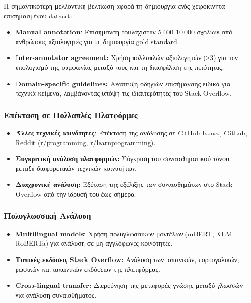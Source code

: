\documentclass[a4paper,11pt,oneside,openany]{ioniothesis}
\begin{document}
Η σημαντικότερη μελλοντική βελτίωση αφορά τη δημιουργία ενός χειροκίνητα επισημασμένου dataset:

\begin{itemize}
    \item \textbf{Manual annotation:} Επισήμανση τουλάχιστον 5.000-10.000 σχολίων από ανθρώπους αξιολογητές για τη δημιουργία gold standard.
    
    \item \textbf{Inter-annotator agreement:} Χρήση πολλαπλών αξιολογητών (≥3) για τον υπολογισμό της συμφωνίας μεταξύ τους και τη διασφάλιση της ποιότητας.
    
    \item \textbf{Domain-specific guidelines:} Ανάπτυξη οδηγιών επισήμανσης ειδικά για τεχνικά κείμενα, λαμβάνοντας υπόψη τις ιδιαιτερότητες του Stack Overflow.
\end{itemize}

\subsubsection{Επέκταση σε Πολλαπλές Πλατφόρμες}

\begin{itemize}
    \item \textbf{Άλλες τεχνικές κοινότητες:} Επέκταση της ανάλυσης σε GitHub Issues, GitLab, Reddit (r/programming, r/learnprogramming).
    
    \item \textbf{Συγκριτική ανάλυση πλατφορμών:} Σύγκριση του συναισθηματικού τόνου μεταξύ διαφορετικών τεχνικών κοινοτήτων.
    
    \item \textbf{Διαχρονική ανάλυση:} Εξέταση της εξέλιξης των συναισθημάτων στο Stack Overflow από την ίδρυσή του έως σήμερα.
\end{itemize}

\subsubsection{Πολυγλωσσική Ανάλυση}

\begin{itemize}
    \item \textbf{Multilingual models:} Χρήση πολυγλωσσικών μοντέλων (mBERT, XLM-RoBERTa) για ανάλυση σε μη αγγλόφωνες κοινότητες.
    
    \item \textbf{Τοπικές εκδόσεις Stack Overflow:} Ανάλυση των ισπανικών, πορτογαλικών, ρωσικών και ιαπωνικών εκδόσεων της πλατφόρμας.
    
    \item \textbf{Cross-lingual transfer:} Διερεύνηση της μεταφοράς γνώσης μεταξύ γλωσσών για ανάλυση συναισθήματος.
\end{itemize}
\end{document}
